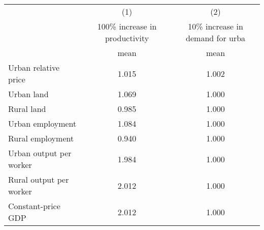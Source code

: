 {
\def\sym#1{\ifmmode^{#1}\else\(^{#1}\)\fi}
\begin{tabular}{l*{2}{c}}
\hline\hline
                    &\multicolumn{1}{c}{(1)}&\multicolumn{1}{c}{(2)}\\
                    &100\% increase in productivity&10\% increase in demand for urba\\
                    &        mean&        mean\\
\hline
Urban relative price&       1.015&       1.002\\
Urban land          &       1.069&       1.000\\
Rural land          &       0.985&       1.000\\
Urban employment    &       1.084&       1.000\\
Rural employment    &       0.940&       1.000\\
Urban output per worker&       1.984&       1.000\\
Rural output per worker&       2.012&       1.000\\
Constant-price GDP  &       2.012&       1.000\\
\hline\hline
\end{tabular}
}
